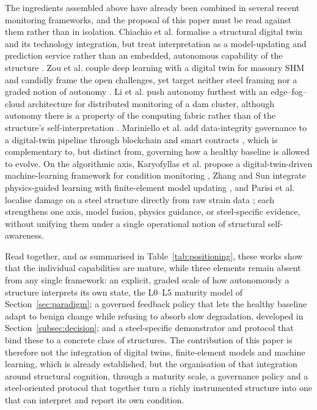 The ingredients assembled above have already been combined in several recent monitoring frameworks, and the proposal of this paper must be read against them rather than in isolation. Chiachio et al. formalise a structural digital twin and its technology integration, but treat interpretation as a model-updating and prediction service rather than an embedded, autonomous capability of the structure \citep{chiachio2022structural}. Zou et al. couple deep learning with a digital twin for masonry SHM and candidly frame the open challenges, yet target neither steel framing nor a graded notion of autonomy \citep{zou2026deep}. Li et al. push autonomy furthest with an edge--fog--cloud architecture for distributed monitoring of a dam cluster, although autonomy there is a property of the computing fabric rather than of the structure's self-interpretation \citep{li2025edge}. Mariniello et al. add data-integrity governance to a digital-twin pipeline through blockchain and smart contracts \citep{mariniello2025enhancing}, which is complementary to, but distinct from, governing how a healthy baseline is allowed to evolve. On the algorithmic axis, Karyofyllas et al. propose a digital-twin-driven machine-learning framework for condition monitoring \citep{karyofyllas2025dtml}, Zhang and Sun integrate physics-guided learning with finite-element model updating \citep{zhang2021physicsguided}, and Parisi et al. localise damage on a steel structure directly from raw strain data \citep{parisi2022steel}; each strengthens one axis, model fusion, physics guidance, or steel-specific evidence, without unifying them under a single operational notion of structural self-awareness.

Read together, and as summarised in Table~\ref{tab:positioning}, these works show that the individual capabilities are mature, while three elements remain absent from any single framework: an explicit, graded scale of how autonomously a structure interprets its own state, the L0--L5 maturity model of Section~\ref{sec:paradigm}; a governed feedback policy that lets the healthy baseline adapt to benign change while refusing to absorb slow degradation, developed in Section~\ref{subsec:decision}; and a steel-specific demonstrator and protocol that bind these to a concrete class of structures. The contribution of this paper is therefore not the integration of digital twins, finite-element models and machine learning, which is already established, but the organisation of that integration around structural cognition, through a maturity scale, a governance policy and a steel-oriented protocol that together turn a richly instrumented structure into one that can interpret and report its own condition.
